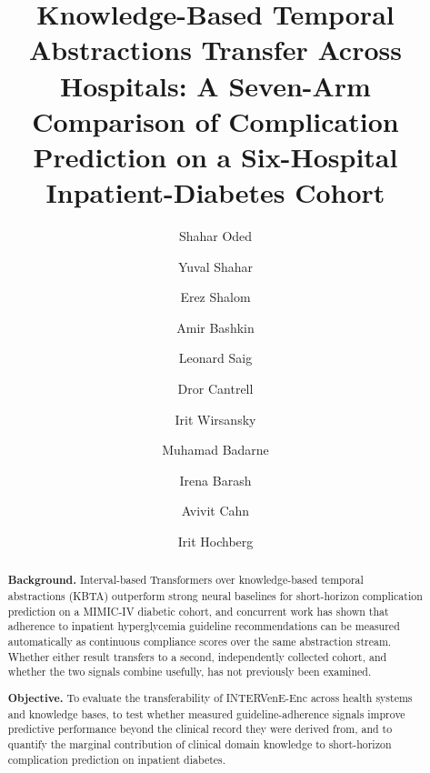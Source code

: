 \documentclass[preprint,12pt]{elsarticle}
\begin{document}
\begin{frontmatter}

\title{Knowledge-Based Temporal Abstractions Transfer Across Hospitals:
A Seven-Arm Comparison of Complication Prediction on a Six-Hospital
Inpatient-Diabetes Cohort}

\author[aff1]{Shahar Oded}
\author[aff1]{Yuval Shahar}
\author[aff1]{Erez Shalom}
\author[aff2,aff3]{Amir Bashkin}
\author[aff4,aff5]{Leonard Saig}
\author[aff6]{Dror Cantrell}
\author[aff7]{Irit Wirsansky}
\author[aff2,aff8]{Muhamad Badarne}
\author[aff9]{Irena Barash}
\author[aff10,aff11]{Avivit Cahn}
\author[aff4,aff7]{Irit Hochberg}

\address[aff1]{Medical Informatics Research Center,
Ben-Gurion University of the Negev, Beer Sheva, Israel}
\address[aff2]{Azrieli Faculty of Medicine,
Bar-Ilan University, Safed, Israel}
\address[aff3]{Endocrinology and Diabetes Unit,
Galilee Medical Center, Nahariya, Israel}
\address[aff4]{Bruce Rappaport Faculty of Medicine,
Technion---Israel Institute of Technology, Haifa, Israel}
\address[aff5]{Endocrinology Institute,
Bnai Zion Medical Center, Haifa, Israel}
\address[aff6]{Internal Medicine Department C,
Shamir Medical Center, Beer Yaakov, Israel}
\address[aff7]{Endocrinology Unit,
Hillel Yaffe Medical Center, Hadera, Israel}
\address[aff8]{Endocrinology and Diabetes Service,
Tzafon Medical Center, Ramat Poriya, Israel}
\address[aff9]{Internal Medicine Department C,
Barzilai Medical Center, Ashkelon, Israel}
\address[aff10]{Internal Medicine Department A,
Hadassah Ein Kerem, Jerusalem, Israel}
\address[aff11]{Faculty of Medicine,
Hadassah Hebrew University Hospital, Jerusalem, Israel}

\begin{abstract}
\textbf{Background.} Interval-based Transformers over knowledge-based
temporal abstractions (KBTA) outperform strong neural baselines for
short-horizon complication prediction on a MIMIC-IV diabetic cohort, and
concurrent work has shown that adherence to inpatient hyperglycemia guideline
recommendations can be measured automatically as continuous compliance scores
over the same abstraction stream. Whether either result transfers to a
second, independently collected cohort, and whether the two signals combine
usefully, has not previously been examined.

\textbf{Objective.} To evaluate the transferability of INTERVenE-Enc across
health systems and knowledge bases, to test whether measured
guideline-adherence signals improve predictive performance beyond the
clinical record they were derived from, and to quantify the marginal
contribution of clinical domain knowledge to short-horizon complication
prediction on inpatient diabetes.


\end{abstract}
\end{frontmatter}
\end{document}
